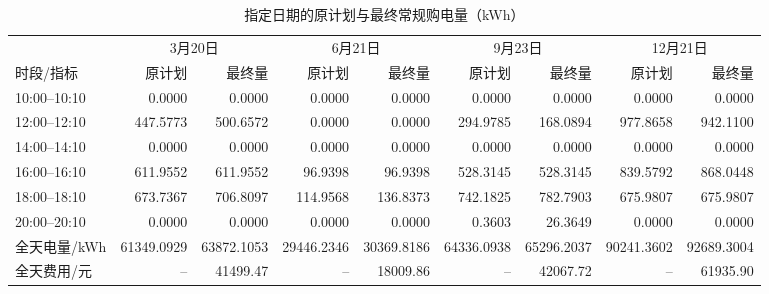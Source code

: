 \begin{table}[H]
\centering\small
\renewcommand{\arraystretch}{0.96}
\setlength{\tabcolsep}{2pt}
\caption{指定日期的原计划与最终常规购电量（kWh）}\label{tab:q3-purchase-dates}
\begin{tabular}{@{}l*{8}{r}@{}}
\toprule
 & \multicolumn{2}{c}{3月20日} & \multicolumn{2}{c}{6月21日} & \multicolumn{2}{c}{9月23日} & \multicolumn{2}{c}{12月21日}\\
\cmidrule(lr){2-3}\cmidrule(lr){4-5}\cmidrule(lr){6-7}\cmidrule(lr){8-9}
时段/指标 & 原计划 & 最终量 & 原计划 & 最终量 & 原计划 & 最终量 & 原计划 & 最终量\\
\midrule
10:00--10:10 & 0.0000 & 0.0000 & 0.0000 & 0.0000 & 0.0000 & 0.0000 & 0.0000 & 0.0000\\
12:00--12:10 & 447.5773 & 500.6572 & 0.0000 & 0.0000 & 294.9785 & 168.0894 & 977.8658 & 942.1100\\
14:00--14:10 & 0.0000 & 0.0000 & 0.0000 & 0.0000 & 0.0000 & 0.0000 & 0.0000 & 0.0000\\
16:00--16:10 & 611.9552 & 611.9552 & 96.9398 & 96.9398 & 528.3145 & 528.3145 & 839.5792 & 868.0448\\
18:00--18:10 & 673.7367 & 706.8097 & 114.9568 & 136.8373 & 742.1825 & 782.7903 & 675.9807 & 675.9807\\
20:00--20:10 & 0.0000 & 0.0000 & 0.0000 & 0.0000 & 0.3603 & 26.3649 & 0.0000 & 0.0000\\
全天电量/kWh & 61349.0929 & 63872.1053 & 29446.2346 & 30369.8186 & 64336.0938 & 65296.2037 & 90241.3602 & 92689.3004\\
全天费用/元 & -- & 41499.47 & -- & 18009.86 & -- & 42067.72 & -- & 61935.90\\
\bottomrule
\end{tabular}
\end{table}
